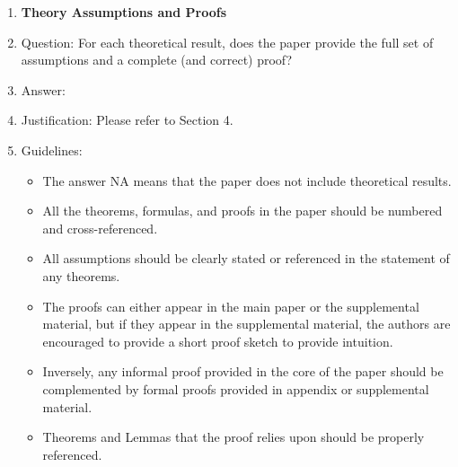 \documentclass{article}
\begin{document}
\begin{enumerate}
\item {\bf Theory Assumptions and Proofs}
    \item[] Question: For each theoretical result, does the paper provide the full set of assumptions and a complete (and correct) proof?
    \item[] Answer: \answerYes{} %
    \item[] Justification: Please refer to Section 4.
    \item[] Guidelines:
    \begin{itemize}
        \item The answer NA means that the paper does not include theoretical results. 
        \item All the theorems, formulas, and proofs in the paper should be numbered and cross-referenced.
        \item All assumptions should be clearly stated or referenced in the statement of any theorems.
        \item The proofs can either appear in the main paper or the supplemental material, but if they appear in the supplemental material, the authors are encouraged to provide a short proof sketch to provide intuition. 
        \item Inversely, any informal proof provided in the core of the paper should be complemented by formal proofs provided in appendix or supplemental material.
        \item Theorems and Lemmas that the proof relies upon should be properly referenced. 
    \end{itemize}


\end{enumerate}
\end{document}

